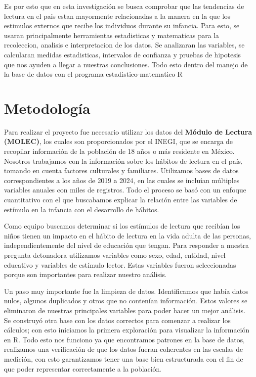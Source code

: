 \documentclass[aps,reprint]{revtex4-2}
\begin{document}
	Es por esto que en esta investigación se busca comprobar que las tendencias de lectura en el pais estan mayormente relacionadas a la manera en la que los estimulos externos que recibe los individuos durante su infancia. Para esto, se usaran principalmente herramientas estadisticas y matematicas para la recoleccion, analisis e interpretacion de los datos. Se analizaran las variables, se calcularan medidas estadisticas, intervalos de confianza y pruebas de hipotesis que nos ayuden a llegar a nuestras conclusiones. Todo esto dentro del manejo de la base de datos con el programa estadistico-matematico R

\section{Metodología}
Para realizar el proyecto fue necesario utilizar los datos del \textbf{Módulo de Lectura (MOLEC)}, los cuales son proporcionados por el INEGI, que se encarga de recopilar información de la población de 18 años o más residente en México. Nosotros trabajamos con la información sobre los hábitos de lectura en el país, tomando en cuenta factores culturales y familiares. Utilizamos bases de datos correspondientes a los años de 2019 a 2024, en las cuales se incluían múltiples variables anuales con miles de registros. Todo el proceso se basó con un enfoque cuantitativo con el que buscabamos explicar la relación entre las variables de estímulo en la infancia con el desarrollo de hábitos.

Como equipo buscamos determinar si los estímulos de lectura que recibían los niños tienen un impacto en el hábito de lectura en la vida adulta de las personas, independientemente del nivel de educación que tengan. Para responder a nuestra pregunta detonadora utilizamos variables como sexo, edad, entidad, nivel educativo y variables de estímulo lector. Estas variables fueron seleccionadas porque son importantes para realizar nuestro análisis.

Un paso muy importante fue la limpieza de datos. Identificamos que había datos nulos, algunos duplicados y otros que no contenían información. Estos valores se eliminaron de nuestras principales variables para poder hacer un mejor análisis. Se construyó otra base con los datos correctos para comenzar a realizar los cálculos; con esto iniciamos la primera exploración para visualizar la información en R. Todo esto nos funciono ya que encontramos patrones en la base de datos, realizamos una verificación de que los datos fueran coherentes  en las escalas de medición, con esto garantizamos tener una base bien estructurada con el fin de que poder representar correctamente a la población.
\end{document}
